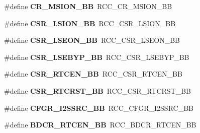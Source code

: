 \begin{DoxyCompactItemize}
\#define {\bfseries C\+R\+\_\+\+M\+S\+I\+O\+N\+\_\+\+BB}~R\+C\+C\+\_\+\+C\+R\+\_\+\+M\+S\+I\+O\+N\+\_\+\+BB
\item 
\mbox{\label{group___h_a_l___r_c_c___aliased_gaa253e36e7e5fb02998c0e4d0388abc52}} 
\#define {\bfseries C\+S\+R\+\_\+\+L\+S\+I\+O\+N\+\_\+\+BB}~R\+C\+C\+\_\+\+C\+S\+R\+\_\+\+L\+S\+I\+O\+N\+\_\+\+BB
\item 
\mbox{\label{group___h_a_l___r_c_c___aliased_ga213e54878ac3849d9ea59567cf73bac2}} 
\#define {\bfseries C\+S\+R\+\_\+\+L\+S\+E\+O\+N\+\_\+\+BB}~R\+C\+C\+\_\+\+C\+S\+R\+\_\+\+L\+S\+E\+O\+N\+\_\+\+BB
\item 
\mbox{\label{group___h_a_l___r_c_c___aliased_gac7c26259006de79c8754693af9712d1a}} 
\#define {\bfseries C\+S\+R\+\_\+\+L\+S\+E\+B\+Y\+P\+\_\+\+BB}~R\+C\+C\+\_\+\+C\+S\+R\+\_\+\+L\+S\+E\+B\+Y\+P\+\_\+\+BB
\item 
\mbox{\label{group___h_a_l___r_c_c___aliased_gac3641969630c9b8eb0f5da2f164a5892}} 
\#define {\bfseries C\+S\+R\+\_\+\+R\+T\+C\+E\+N\+\_\+\+BB}~R\+C\+C\+\_\+\+C\+S\+R\+\_\+\+R\+T\+C\+E\+N\+\_\+\+BB
\item 
\mbox{\label{group___h_a_l___r_c_c___aliased_ga55aab5ed906bf71760d81cc5acefd55c}} 
\#define {\bfseries C\+S\+R\+\_\+\+R\+T\+C\+R\+S\+T\+\_\+\+BB}~R\+C\+C\+\_\+\+C\+S\+R\+\_\+\+R\+T\+C\+R\+S\+T\+\_\+\+BB
\item 
\mbox{\label{group___h_a_l___r_c_c___aliased_ga9076f5ddbb262fd45584702f5d280c9e}} 
\#define {\bfseries C\+F\+G\+R\+\_\+\+I2\+S\+S\+R\+C\+\_\+\+BB}~R\+C\+C\+\_\+\+C\+F\+G\+R\+\_\+\+I2\+S\+S\+R\+C\+\_\+\+BB
\item 
\mbox{\label{group___h_a_l___r_c_c___aliased_gaf70aaf70b0752ccb3a60307b2fb46038}} 
\#define {\bfseries B\+D\+C\+R\+\_\+\+R\+T\+C\+E\+N\+\_\+\+BB}~R\+C\+C\+\_\+\+B\+D\+C\+R\+\_\+\+R\+T\+C\+E\+N\+\_\+\+BB
\item 
\mbox{\label{group___h_a_l___r_c_c___aliased_ga892fdf297b85b85cbaf0723649b31818}} 

\end{DoxyCompactItemize}
